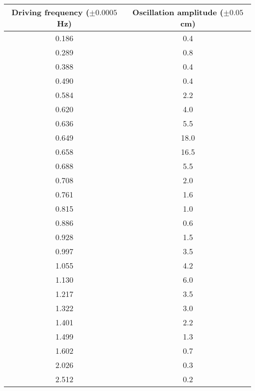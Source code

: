 \begin{tabular}{cc}
\toprule
 Driving frequency ($\pm 0.0005$ Hz) &  Oscillation amplitude ($\pm 0.05$ cm) \\
\midrule
                               0.186 &                                    0.4 \\
                               0.289 &                                    0.8 \\
                               0.388 &                                    0.4 \\
                               0.490 &                                    0.4 \\
                               0.584 &                                    2.2 \\
                               0.620 &                                    4.0 \\
                               0.636 &                                    5.5 \\
                               0.649 &                                   18.0 \\
                               0.658 &                                   16.5 \\
                               0.688 &                                    5.5 \\
                               0.708 &                                    2.0 \\
                               0.761 &                                    1.6 \\
                               0.815 &                                    1.0 \\
                               0.886 &                                    0.6 \\
                               0.928 &                                    1.5 \\
                               0.997 &                                    3.5 \\
                               1.055 &                                    4.2 \\
                               1.130 &                                    6.0 \\
                               1.217 &                                    3.5 \\
                               1.322 &                                    3.0 \\
                               1.401 &                                    2.2 \\
                               1.499 &                                    1.3 \\
                               1.602 &                                    0.7 \\
                               2.026 &                                    0.3 \\
                               2.512 &                                    0.2 \\
\bottomrule
\end{tabular}
